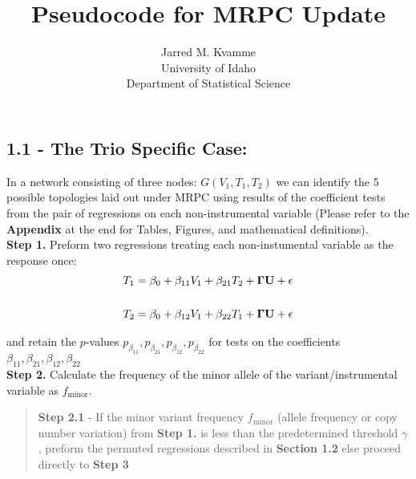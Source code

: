 \documentclass[12pt]{report}
\begin{document}
\begin{titlepage}
\title{Pseudocode for MRPC Update}
\author{ Jarred M. Kvamme \\ University of Idaho \\ Department of Statistical Science }
\maketitle
\end{titlepage}

\newcommand{\indep}{\perp \!\!\! \perp}



\subsection*{1.1 - The Trio Specific Case:}

In a network consisting of three nodes: $G(V_1, T_1, T_2)$ we can identify the 5 possible topologies laid out under MRPC using results of the coefficient tests from the pair of regressions on each non-instrumental variable (Please refer to the \textbf{Appendix} at the end for Tables, Figures, and mathematical definitions).\\


\noindent \textbf{Step 1.} Preform two regressions treating each non-instumental variable as the response once:  
\begin{eqnarray}
T_1 = \beta_0 +\beta_{11}V_1+\beta_{21}T_2+{\bf \Gamma U}+ \epsilon \\
\nonumber\\
T_2 = \beta_0 +\beta_{12}V_1+\beta_{22}T_1+{\bf \Gamma U}+ \epsilon 
\end{eqnarray}

and retain the $p$-values $p_{\beta_{11}}, p_{\beta_{21}}, p_{\beta_{12}}, p_{\beta_{22}}$ for tests on the coefficients $\beta_{11}, \beta_{21}, \beta_{12}, \beta_{22}$\\

\noindent \textbf{Step 2.} Calculate the frequency of the minor allele of the variant/instrumental variable as $f_{\text{minor}}$. \\

\begin{quote}
\textbf{Step 2.1} - If the minor variant frequency $f_{\text{minor}}$ (allele frequency or copy number variation) from \textbf{Step 1.} is less than the predetermined threshold $\gamma$, preform the permuted regressions described in \textbf{Section 1.2} else proceed directly to \textbf{Step 3}
\end{quote}
\end{document}
